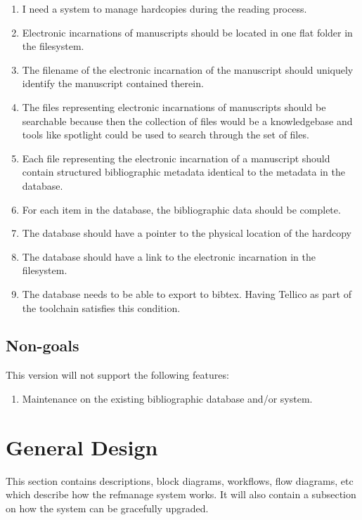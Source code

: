 \documentclass[letterpaper,12pt]{article}
\begin{document}
\begin{enumerate}
\item I need a system to manage hardcopies during the reading process.


\item Electronic incarnations of manuscripts should be located in one flat folder in the filesystem. 

\item The filename of the electronic incarnation of the manuscript should uniquely identify the manuscript contained therein.

\item The files representing electronic incarnations of manuscripts should be searchable because then the collection of files would be a knowledgebase and tools like spotlight could be used to search through the set of files.

\item Each file representing the electronic incarnation of a manuscript should contain structured bibliographic metadata identical to the metadata in the database.


\item For each item in the database, the bibliographic data should be complete.

\item The database should have a pointer to the physical location of the hardcopy 

\item The database should have a link to the electronic incarnation in the filesystem. 

\item The database needs to be able to export to bibtex. Having Tellico as part of the toolchain satisfies this condition.
\end{enumerate}


\subsection{Non-goals}
This version will not support the following features:

\begin{enumerate}
\item Maintenance on the existing bibliographic database and/or system.
\end{enumerate}


\section{General Design}
This section contains descriptions, block diagrams, workflows, flow diagrams, etc which describe how the refmanage system works. It will also contain a subsection on how the system can be gracefully upgraded.
\end{document}
